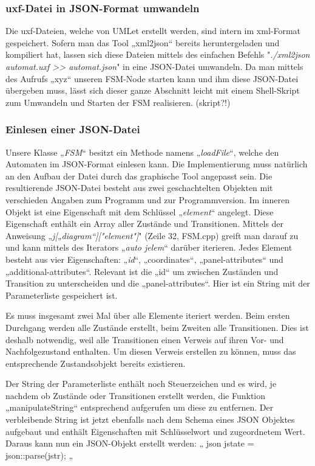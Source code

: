 \subsubsection{uxf-Datei in JSON-Format umwandeln}
Die uxf-Dateien, welche von UMLet erstellt werden, sind intern im xml-Format
gespeichert. Sofern man das Tool „xml2json“ bereits heruntergeladen und
kompiliert hat, lassen sich diese Dateien mittels des einfachen Befehls
"\textit{./xml2json automat.uxf >> automat.json}" in eine JSON-Datei umwandeln.
Da man mittels des Aufrufs „xyz“ unseren FSM-Node starten kann und ihm diese
JSON-Datei übergeben muss, lässt sich dieser ganze Abschnitt leicht mit einem
Shell-Skript zum Umwandeln und Starten der FSM realisieren.
(skript?!)


\subsubsection{Einlesen einer JSON-Datei}
Unsere Klasse „\textit{FSM}“ besitzt ein Methode namens „\textit{loadFile}“, welche den Automaten
im JSON-Format einlesen kann. Die Implementierung muss natürlich an den Aufbau
der Datei durch das graphische Tool angepasst sein. Die resultierende
JSON-Datei besteht aus zwei geschachtelten Objekten mit verschieden Angaben zum
Programm und zur Programmversion. Im inneren Objekt ist eine Eigenschaft mit dem
Schlüssel „\textit{element}“ angelegt. Diese Eigenschaft enthält ein Array aller Zustände
und Transitionen.
Mittels der Anweisung „\textit{j[„diagram“]["element"]}" (Zeile 32, FSM.cpp) greift man
darauf zu und kann mittels des Iterators „\textit{auto jelem}“ darüber iterieren.
Jedes Element besteht aus vier Eigenschaften: „\textit{id}“, „coordinates“,
„panel-attributes“ und „additional-attributes“. Relevant ist die „id“ um
zwischen Zuständen und Transition zu unterscheiden und die „panel-attributes“.
Hier ist ein String mit der Parameterliste gespeichert ist.

Es muss insgesamt zwei Mal über alle Elemente iteriert werden. Beim ersten
Durchgang werden alle Zustände erstellt, beim Zweiten alle Transitionen. Dies
ist deshalb notwendig, weil alle Transitionen einen Verweis auf ihren Vor- und
Nachfolgezustand enthalten. Um diesen Verweis erstellen zu können, muss das
entsprechende Zustandsobjekt bereits existieren.

Der String der Parameterliste enthält noch Steuerzeichen und es wird, je
nachdem ob Zustände oder Transitionen erstellt werden, die Funktion
„manipulateString“ entsprechend aufgerufen um diese zu entfernen. Der
verbleibende String ist jetzt ebenfalls nach dem Schema eines JSON Objektes
aufgebaut und enthält Eigenschaften mit Schlüsselwort und zugeordnetem Wert.
Daraus kann nun ein JSON-Objekt erstellt werden:
„ json jstate = json::parse(jstr); „

